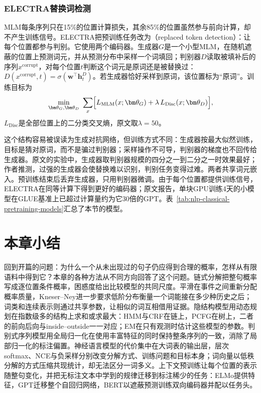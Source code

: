 \subsubsection{ELECTRA替换词检测}
\label{sec:nlp-classical-electra}

MLM每条序列只在15\%的位置计算损失，其余85\%的位置虽然参与前向计算，却不产生训练信号。ELECTRA把预训练任务改为（replaced token detection）：让每个位置都参与判别。它使用两个编码器。生成器$G$是一个小型MLM，在随机遮蔽的位置上预测词元，并从预测分布中采样一个词填回；判别器$D$读取被填补后的序列$x^{\mathrm{corrupt}}$，对每个位置$t$判断这个词元是原词还是被替换过：$D(x^{\mathrm{corrupt}},t)=\sigma(\bm w^{\top}\bm h^{D}_t)$。若生成器恰好采样到原词，该位置标为“原词”。训练目标为
\begin{equation}
  \min_{\bm\theta_G,\bm\theta_D}\ \sum_{x}\Bigl[L_{\mathrm{MLM}}(x;\bm\theta_G)+\lambda\,L_{\mathrm{Disc}}(x;\bm\theta_D)\Bigr],
  \label{eq:nlp-classical-electra}
\end{equation}
$L_{\mathrm{Disc}}$是全部位置上的二分类交叉熵，原文取$\lambda=50$。

这个结构容易被误读为生成对抗网络，但训练方式不同：生成器按最大似然训练，目标是猜对原词，而不是骗过判别器；采样操作不可导，判别器的梯度也不回传给生成器。原文的实验中，生成器取判别器规模的四分之一到二分之一时效果最好；作者推测，过强的生成器会使替换难以识别，判别任务变得过难。两者共享词元嵌入。预训练结束后丢弃生成器，只用判别器微调。由于每个位置都提供训练信号，ELECTRA在同等计算下得到更好的编码器；原文报告，单块GPU训练4天的小模型在GLUE基准上已超过计算量约为它30倍的GPT。表~\ref{tab:nlp-classical-pretraining-models}汇总了本节的模型。

\section{本章小结}
\label{sec:nlp-classical-summary}

回到开篇的问题：为什么一个从未出现过的句子仍应得到合理的概率，怎样从有限语料中得到它？本章的各种方法从不同方向回答了这个问题。链式分解把整句概率写成逐位置条件概率，困惑度给出比较模型的共同尺度。平滑在事件之间重新分配概率质量，Kneser--Ney进一步要求低阶分布衡量一个词能接在多少种历史之后；词类和连续表示则通过共享参数，让相似的词互相借用证据。隐结构模型用动态规划在指数级多的结构上求和或求最大：HMM与CRF在链上，PCFG在树上，二者的前向后向与inside--outside一一对应；EM在只有观测时估计这些模型的参数。判别式序列模型用全局归一化在使用丰富特征的同时保持整条序列的一致，消除了局部归一化的标注偏置。神经语言模型的代价集中在大词表的输出层，层次softmax、NCE与负采样分别改变分解方式、训练问题和目标本身；词向量以低秩分解的方式压缩共现统计，却无法区分一词多义。上下文预训练让每个位置的表示随整句变化，并把无标注文本中学到的规律迁移到标注稀少的任务：ELMo提供特征，GPT迁移整个自回归网络，BERT以遮蔽预测训练双向编码器并配以任务头。

